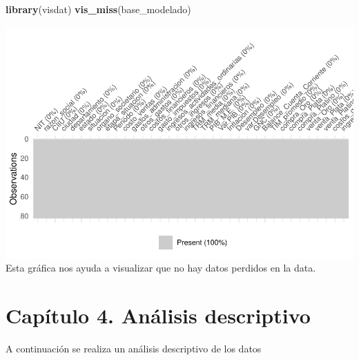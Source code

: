 \documentclass[
  11pt,
  a4paper,
]{book}
\newenvironment{Shaded}{\begin{snugshade}}{\end{snugshade}}
\newcommand{\DataTypeTok}[1]{\textcolor[rgb]{0.13,0.29,0.53}{#1}}
\newcommand{\DecValTok}[1]{\textcolor[rgb]{0.00,0.00,0.81}{#1}}
\newcommand{\FloatTok}[1]{\textcolor[rgb]{0.00,0.00,0.81}{#1}}
\newcommand{\KeywordTok}[1]{\textcolor[rgb]{0.13,0.29,0.53}{\textbf{#1}}}
\newcommand{\NormalTok}[1]{#1}
\newcommand{\OperatorTok}[1]{\textcolor[rgb]{0.81,0.36,0.00}{\textbf{#1}}}
\newcommand{\StringTok}[1]{\textcolor[rgb]{0.31,0.60,0.02}{#1}}
\begin{document}
\begin{Shaded}
\begin{Highlighting}[]
\KeywordTok{library}\NormalTok{(visdat)}
\KeywordTok{vis_miss}\NormalTok{(base_modelado)}
\end{Highlighting}
\end{Shaded}

\includegraphics{index_files/figure-latex/unnamed-chunk-5-1.pdf} Esta
gráfica nos ayuda a visualizar que no hay datos perdidos en la data.

\hypertarget{capuxedtulo-4.-anuxe1lisis-descriptivo}{%
\chapter{Capítulo 4. Análisis
descriptivo}\label{capuxedtulo-4.-anuxe1lisis-descriptivo}}

A continuación se realiza un análisis descriptivo de los datos

\begin{Shaded}
\end{Shaded}
\end{document}
